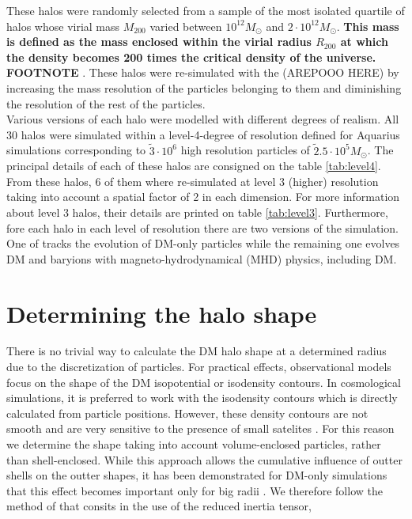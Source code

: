 \documentclass[a4paper,fleqn,usenatbib]{mnras}
\begin{document}
These halos were randomly selected from a sample of the most isolated quartile of halos whose virial mass $M_{200}$ varied between $10^{12}M_\odot$ and $2\cdot 10^{12}M_\odot$. \textbf{\tiny This mass is defined as the mass enclosed within the virial radius $R_{200}$ at which the density becomes 200 times the critical density of the universe. \huge FOOTNOTE \normalsize}. These halos were re-simulated with the (AREPOOO HERE) by increasing the mass resolution of the particles belonging to them and diminishing the resolution of the rest of the particles.\\

Various versions of each halo were modelled with different degrees of realism. All 30 halos were simulated within a level-4-degree of resolution defined for Aquarius simulations corresponding to $\tilde 3\cdot 10^6$ high resolution particles of $\tilde 2.5 \cdot 10^5 M_\odot$. The principal details of each of these halos are consigned on the table \ref{tab:level4}. From these halos, 6 of them where re-simulated at level 3 (higher) resolution taking into account a spatial factor of 2 in each dimension. For more information about level 3 halos, their details are printed on table \ref{tab:level3}. Furthermore, fore each halo in each level of resolution there are two versions of the simulation. One of tracks the evolution of DM-only particles while the remaining one evolves DM and baryions with magneto-hydrodynamical (MHD) physics, including DM.\\


\section{Determining the halo shape}


There is no trivial way to calculate the DM halo shape at a determined radius due to the discretization of particles. For practical effects, observational models focus on the shape of the DM isopotential \cite{isopotential} or isodensity \cite{isodensity} contours. In cosmological simulations, it is preferred to work with the isodensity contours which is directly calculated from particle positions. However, these density contours are not smooth and are very sensitive to the presence of small satelites \cite{Springel Isodensity}. For this reason we determine the shape taking into account volume-enclosed particles, rather than shell-enclosed. While this approach allows the cumulative influence of outter shells on the outter shapes, it has been demonstrated for DM-only simulations that this effect becomes important only for big radii \cite{vera-Ciro aquarius}.  We therefore follow the method of \cite[Allgood et al. 2006]{Allgood_et_al._2006} that consits in the use of the reduced inertia tensor,   \\
\end{document}
